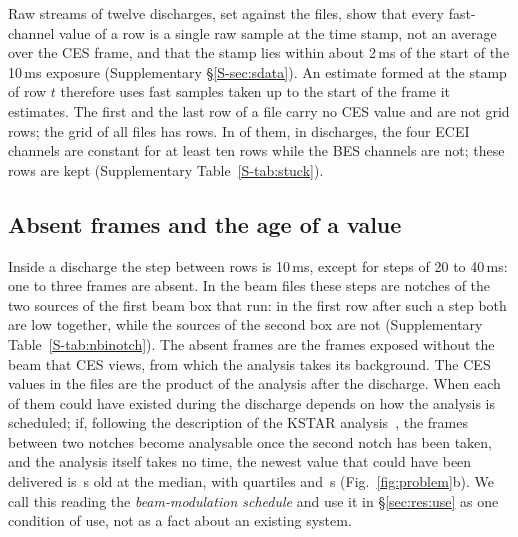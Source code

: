 \documentclass[11pt,a4paper]{article}
\newcommand{\Supp}[1]{Supplementary \S\ref{S-#1}}
\newcommand{\SuppTab}[1]{Supplementary Table~\ref{S-#1}}
\begin{document}
\begin{table}[tbp]
  \centering
  \caption{The data set: KSTAR, 2022 campaign, shots 30801--32751, the 635 discharges with scored rows (all 641 files hold 245{,}925 grid rows and 1{,}414 absent steps). Percentiles are over discharges or over rows as stated; the beam line leaves out the 13 files whose power columns of the second beam box are invalid.}
  \label{tab:dataset}
  \TabDataset
\end{table}

Raw streams of twelve discharges, set against the files, show that every fast-channel
value of a row is a single raw sample at the time stamp, not an average over the CES
frame, and that the stamp lies within about 2\,ms of the start of the 10\,ms exposure
(\Supp{sec:sdata}). An estimate formed at the stamp of row $t$ therefore uses fast samples
taken up to the start of the frame it estimates. The first and the last row of a file
carry no CES value and are not grid rows; the grid of all files has \NGridRows{} rows. In
\StuckShare{} of them, in \NStuckDischarges{} discharges, the four ECEI channels are
constant for at least ten rows while the BES channels are not; these rows are kept
(\SuppTab{tab:stuck}).

\subsection{Absent frames and the age of a value}
\label{sec:data:late}

Inside a discharge the step between rows is 10\,ms, except for steps of 20 to 40\,ms: one
to three frames are absent. In the beam files these steps are notches of the two sources
of the first beam box that run: in the first row after such a step both are low together,
while the sources of the second box are not (\SuppTab{tab:nbinotch}). The absent frames
are the frames exposed without the beam that CES views, from which the analysis takes its
background. The CES values in the files are the product of the analysis after the
discharge. When each of them could have existed during the discharge depends on how the
analysis is scheduled; if, following the description of the KSTAR
analysis~\citep{Lee2020TwoGaussian}, the frames between two notches become analysable
once the second notch has been taken, and the analysis itself takes no time, the newest
value that could have been delivered is \AgeMedianS\,s old at the median, with quartiles
\AgeQuartLoS{} and \AgeQuartHiS\,s (Fig.~\ref{fig:problem}b). We call this reading the
\emph{beam-modulation schedule} and use it in \S\ref{sec:res:use} as one condition of
use, not as a fact about an existing system.
\end{document}
